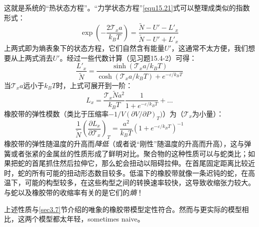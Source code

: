 这就是系统的“热状态方程”。“力学状态方程”\eqref{equ15.21}式可以整理成类似的指数形式：
\begin{equation}
	\exp \left( -\frac{2 \mathscr{T}_x a}{k_B T} \right) = \frac{\tilde{N} - U' - L'_x}{\tilde{N} - U' + L'_x}
\label{equ15.24}
\end{equation}
上两式即为熵表象下的状态方程，它们自然含有能量$U'$，这通常不太方便，我们想要从上两式消去$U'$。经过一些代数计算（见习题15.4-2）可得：
\begin{equation}
	\frac{L'_x}{\tilde{N}} = \frac{\sinh (\mathscr{T}_x a / k_B T)}{\cosh (\mathscr{T}_x a / k_B T) + e^{-\varepsilon / k_B T}}
\label{equ15.25}
\end{equation}
当$\mathscr{T}_x a$远小于$k_B T$时，上式可展开到一阶：
\begin{equation}
	L_x = \frac{\mathscr{T}_x \tilde{N} a^2}{k_B T} \frac{1}{1 + e^{-\varepsilon / k_B T}} + \dots
\label{equ15.26}
\end{equation}
橡胶带的弹性模数（类比于压缩率$-1/V (\partial V / \partial P)_T)$）为（$\mathscr{T}_x$为小量）：
\begin{equation}
	\frac{1}{\tilde{N}} \left( \frac{\partial L_x}{\partial \mathscr{T}_x} \right)_T = \frac{a^2}{k_B T} (1 + e^{-\varepsilon / k_B T})^{-1}
\label{equ15.27}
\end{equation}
橡胶带的弹性随温度的升高而{\it 降低}（或者说“刚性”随温度的升高而升高），这与弹簧或者张紧的金属丝的性质形成了鲜明对比。聚合物的这种性质可以与蛇类比；如果把蛇的首尾抓住然后拉伸它，那么蛇会扭动以阻碍拉伸。在首尾固定距离比较近时，蛇的所有可能的扭动形态数目较多。低温下的橡胶带就像一条迟钝的蛇，在高温下，可能的构型较多，在这些构型之间的转换速率较快，这导致收缩张力较大。与蛇以及橡胶带的收缩率有关的是它们的{\it 熵}！

上述性质与\ref{sec3.7}节介绍的唯象的橡胶带模型定性符合。然而与更实际的模型相比，这两个模型都太年轻，sometimes naive。

